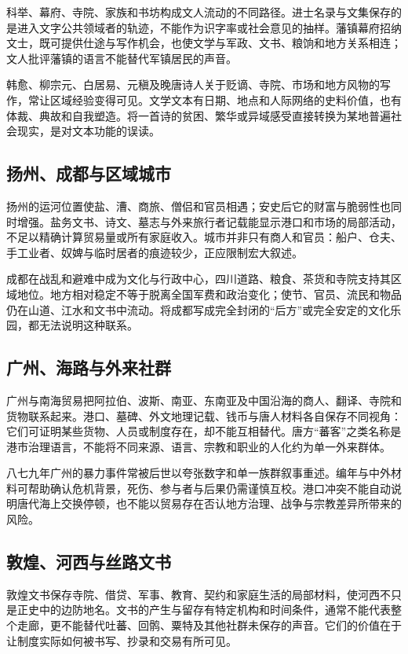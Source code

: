科举、幕府、寺院、家族和书坊构成文人流动的不同路径。进士名录与文集保存的是进入文字公共领域者的轨迹，不能作为识字率或社会意见的抽样。藩镇幕府招纳文士，既可提供仕途与写作机会，也使文学与军政、文书、粮饷和地方关系相连；文人批评藩镇的语言不能替代军镇居民的声音。

韩愈、柳宗元、白居易、元稹及晚唐诗人关于贬谪、寺院、市场和地方风物的写作，常让区域经验变得可见。文学文本有日期、地点和人际网络的史料价值，也有体裁、典故和自我塑造。将一首诗的贫困、繁华或异域感受直接转换为某地普遍社会现实，是对文本功能的误读。

\subsection{扬州、成都与区域城市}

扬州的运河位置使盐、漕、商旅、僧侣和官员相遇；安史后它的财富与脆弱性也同时增强。盐务文书、诗文、墓志与外来旅行者记载能显示港口和市场的局部活动，不足以精确计算贸易量或所有家庭收入。城市并非只有商人和官员：船户、仓夫、手工业者、奴婢与临时居者的痕迹较少，正应限制宏大叙述。

成都在战乱和避难中成为文化与行政中心，四川道路、粮食、茶货和寺院支持其区域地位。地方相对稳定不等于脱离全国军费和政治变化；使节、官员、流民和物品仍在山道、江水和文书中流动。将成都写成完全封闭的“后方”或完全安定的文化乐园，都无法说明这种联系。

\subsection{广州、海路与外来社群}

广州与南海贸易把阿拉伯、波斯、南亚、东南亚及中国沿海的商人、翻译、寺院和货物联系起来。港口、墓碑、外文地理记载、钱币与唐人材料各自保存不同视角：它们可证明某些货物、人员或制度存在，却不能互相替代。唐方“蕃客”之类名称是港市治理语言，不能将不同来源、语言、宗教和职业的人化约为单一外来群体。

八七九年广州的暴力事件常被后世以夸张数字和单一族群叙事重述。编年与中外材料可帮助确认危机背景，死伤、参与者与后果仍需谨慎互校。港口冲突不能自动说明唐代海上交换停顿，也不能以贸易存在否认地方治理、战争与宗教差异所带来的风险。

\subsection{敦煌、河西与丝路文书}

敦煌文书保存寺院、借贷、军事、教育、契约和家庭生活的局部材料，使河西不只是正史中的边防地名。文书的产生与留存有特定机构和时间条件，通常不能代表整个走廊，更不能替代吐蕃、回鹘、粟特及其他社群未保存的声音。它们的价值在于让制度实际如何被书写、抄录和交易有所可见。

